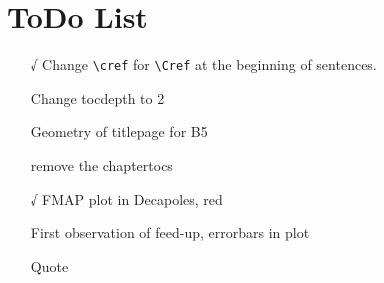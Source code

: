 \chapter*{ToDo List}

\begin{itemize}
    \tightlist
    \item[√] Change \verb|\cref| for \verb|\Cref| at the beginning of sentences.
    \item[ ] Change tocdepth to 2
    \item[ ] Geometry of titlepage for B5
    \item[ ] remove the chaptertocs
    \item[√] FMAP plot in Decapoles, red
    \item[ ] First observation of feed-up, errorbars in plot
    \item[ ] Quote
\end{itemize}